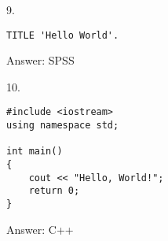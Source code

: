 \documentclass{article}
\begin{document}
\hrulefill
\begin{multicols}{2}


9.
\begin{verbatim}
TITLE 'Hello World'.
\end{verbatim}

\columnbreak

\begin{flushright}
    Answer: SPSS
\end{flushright}

\end{multicols}


\hrulefill
\begin{multicols}{2}


10.
\begin{verbatim}
#include <iostream>
using namespace std;

int main() 
{
    cout << "Hello, World!";
    return 0;
}
\end{verbatim}

\columnbreak

\begin{flushright}
    Answer: C++
\end{flushright}

\end{multicols}
\end{document}
